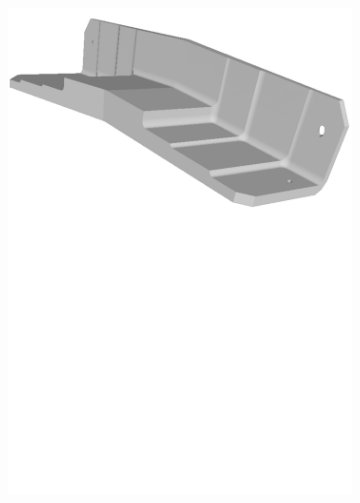 \begin{figure}[h!]
{\begin{tcolorbox}
\begin{subfigure}[c]{.23\textwidth}
         \includegraphics[trim={0cm 17cm 0cm 0cm},clip,width=1\linewidth,angle=0]{Cap5/Figuras/objects/support_bracket.pdf}
         \caption{}
         \label{fig:support_bracket}
      \end{subfigure}
      \hfill
      \begin{subfigure}[c]{.23\textwidth}
         \centering

\end{subfigure}
\end{tcolorbox}}
\end{figure}
